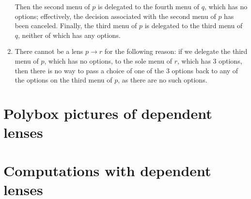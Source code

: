 \documentclass[Book-Poly]{subfiles}
\begin{document}
\begin{exercise}
\begin{solution}
\begin{enumerate}
    Then the second menu of $p$ is delegated to the fourth menu of $q$, which has no options; effectively, the decision associated with the second menu of $p$ has been canceled.
    Finally, the third menu of $p$ is delegated to the third menu of $q$, neither of which has any options.
    \item There cannot be a lens $p \to r$ for the following reason: if we delegate the third menu of $p$, which has no options, to the sole menu of $r$, which has $3$ options, then there is no way to pass a choice of one of the $3$ options back to any of the options on the third menu of $p$, as there are no such options.
\end{enumerate}
\end{solution}
\end{exercise}


\section{Polybox pictures of dependent lenses}


\section{Computations with dependent lenses}

\end{document}
